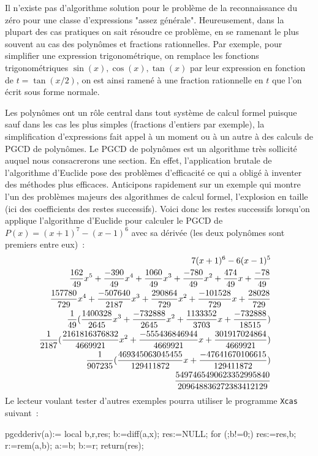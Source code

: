 \documentclass[a4paper,11pt]{article}
\begin{document}
\begin{giacjshere}
Il n'existe pas d'algorithme solution
pour le problème de la reconnaissance du zéro pour une classe 
d'expressions "assez générale". Heureusement, 
dans la plupart des cas pratiques on sait résoudre ce problème, en
se ramenant le plus souvent au cas des polynômes et fractions rationnelles.
Par exemple, pour simplifier une expression trigonométrique,
on remplace les fonctions trigonométriques $\sin(x), \cos(x), \tan(x)$
par leur expression en fonction de $t=\tan(x/2)$, on est ainsi ramené
à une fraction rationnelle en $t$ que l'on écrit sous forme normale.

Les polynômes ont un r\^ole central dans tout syst\`eme de calcul formel
puisque sauf dans les cas les plus simples (fractions d'entiers par exemple), 
la simplification d'expressions
fait appel \`a un moment ou \`a un autre \`a des calculs
de PGCD de polyn\^omes. Le PGCD de polynômes est un algorithme 
très sollicité auquel nous consacrerons une section. En effet,
l'application brutale de l'algorithme d'Euclide pose des problèmes
d'efficacité ce qui a obligé à inventer des méthodes plus efficaces.
Anticipons rapidement sur un exemple qui montre l'un des problèmes
majeurs des algorithmes de calcul formel, l'explosion en taille
(ici des coefficients des restes successifs).
Voici donc les restes successifs lorsqu'on applique l'algorithme
d'Euclide pour calculer le PGCD de $P(x)=(x+1)^{7}-(x-1)^{6}$ avec
sa d\'eriv\'ee (les deux polyn\^omes sont premiers entre eux)~:
\begin{eqnarray*}
7\* (x+1)^{6}-6\* (x-1)^{5} & &\\
\frac{162}{49} \* x^{5}+\frac{-390}{49} \* x^{4}+\frac{1060}{49} \* x^{3}+\frac{-780}{49} \* x^{2}+\frac{474}{49} \* x+\frac{-78}{49}& &\\
\frac{157780}{729} \* x^{4}+\frac{-507640}{2187} \* x^{3}+\frac{290864}{729} \* x^{2}+\frac{-101528}{729} \* x+\frac{28028}{729}& &\\
\frac{1}{49} \* (\frac{1400328}{2645} \* x^{3}+\frac{-732888}{2645} \* x^{2}+\frac{1133352}{3703} \* x+\frac{-732888}{18515})& &\\
\frac{1}{2187} \* (\frac{2161816376832}{4669921} \* x^{2}+\frac{-555436846944}{4669921} \* x+\frac{301917024864}{4669921})& &\\
\frac{1}{907235} \* (\frac{469345063045455}{129411872} \* x+\frac{-47641670106615}{129411872})& &\\
\frac{5497465490623352995840}{209648836272383412129}
\end{eqnarray*}
Le lecteur voulant tester d'autres exemples pourra utiliser le programme 
\verb|Xcas| suivant~:
\begin{giacprog}
pgcdderiv(a):={
  local b,r,res;
  b:=diff(a,x);
  res:=NULL;
  for (;b!=0;){
    res:=res,b;
    r:=rem(a,b);
    a:=b;
    b:=r;
  }
  return(res);
}
\end{giacprog}


\end{giacjshere}
\end{document}
